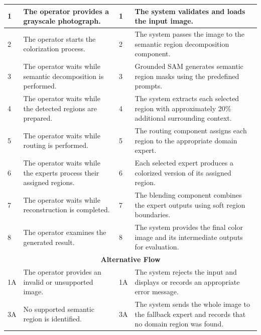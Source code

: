 \documentclass{FastFyp}
\begin{document}
\begin{longtable}{|p{0.7cm}|p{2.7cm}|p{3.5cm}|p{0.8cm}|p{5.7cm}|}
1 &
\multicolumn{2}{p{6.2cm}|}{
The operator provides a grayscale photograph.
} &
1 &
The system validates and loads the input image. \\ \hline

2 &
\multicolumn{2}{p{6.2cm}|}{
The operator starts the colorization process.
} &
2 &
The system passes the image to the semantic region decomposition component. \\ \hline

3 &
\multicolumn{2}{p{6.2cm}|}{
The operator waits while semantic decomposition is performed.
} &
3 &
Grounded SAM generates semantic region masks using the predefined prompts. \\ \hline

4 &
\multicolumn{2}{p{6.2cm}|}{
The operator waits while the detected regions are prepared.
} &
4 &
The system extracts each selected region with approximately 20\% additional surrounding context. \\ \hline

5 &
\multicolumn{2}{p{6.2cm}|}{
The operator waits while routing is performed.
} &
5 &
The routing component assigns each region to the appropriate domain expert. \\ \hline

6 &
\multicolumn{2}{p{6.2cm}|}{
The operator waits while the experts process their assigned regions.
} &
6 &
Each selected expert produces a colorized version of its assigned region. \\ \hline

7 &
\multicolumn{2}{p{6.2cm}|}{
The operator waits while reconstruction is completed.
} &
7 &
The blending component combines the expert outputs using soft region boundaries. \\ \hline

8 &
\multicolumn{2}{p{6.2cm}|}{
The operator examines the generated result.
} &
8 &
The system provides the final color image and its intermediate outputs for evaluation. \\ \hline

\multicolumn{5}{|c|}{\textbf{Alternative Flow}} \\ \hline

1A &
\multicolumn{2}{p{6.2cm}|}{
The operator provides an invalid or unsupported image.
} &
1A &
The system rejects the input and displays or records an appropriate error message. \\ \hline

3A &
\multicolumn{2}{p{6.2cm}|}{
No supported semantic region is identified.
} &
3A &
The system sends the whole image to the fallback expert and records that no domain region was found. \\ \hline


\end{longtable}
\end{document}
